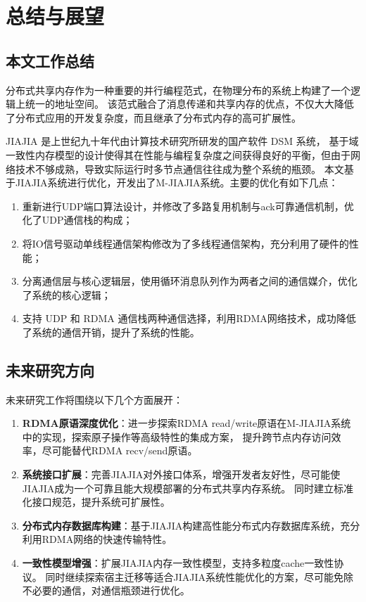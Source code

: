 \chapter{总结与展望}\label{chap:summary}{
    \section{本文工作总结}
    分布式共享内存作为一种重要的并行编程范式，在物理分布的系统上构建了一个逻辑上统一的地址空间。
    该范式融合了消息传递和共享内存的优点，不仅大大降低了分布式应用的开发复杂度，而且继承了分布式内存的高可扩展性。

    JIAJIA 是上世纪九十年代由计算技术研究所研发的国产软件 DSM 系统，
    基于域一致性内存模型的设计使得其在性能与编程复杂度之间获得良好的平衡，但由于网络技术不够成熟，导致实际运行时多节点通信往往成为整个系统的瓶颈。
    本文基于JIAJIA系统进行优化，开发出了M-JIAJIA系统。主要的优化有如下几点：
    \begin{enumerate}
        \item 重新进行UDP端口算法设计，并修改了多路复用机制与ack可靠通信机制，优化了UDP通信栈的构成；
        \item 将IO信号驱动单线程通信架构修改为了多线程通信架构，充分利用了硬件的性能；
        \item 分离通信层与核心逻辑层，使用循环消息队列作为两者之间的通信媒介，优化了系统的核心逻辑；
        \item 支持 UDP 和 RDMA 通信栈两种通信选择，利用RDMA网络技术，成功降低了系统的通信开销，提升了系统的性能。
    \end{enumerate}

    \section{未来研究方向}

    未来研究工作将围绕以下几个方面展开：

    \begin{enumerate}
        \item \textbf{RDMA原语深度优化}：进一步探索RDMA read/write原语在M-JIAJIA系统中的实现，探索原子操作等高级特性的集成方案，
              提升跨节点内存访问效率，尽可能替代RDMA recv/send原语。

        \item \textbf{系统接口扩展}：完善JIAJIA对外接口体系，增强开发者友好性，尽可能使JIAJIA成为一个可靠且能大规模部署的分布式共享内存系统。
              同时建立标准化接口规范，提升系统可扩展性。

        \item \textbf{分布式内存数据库构建}：基于JIAJIA构建高性能分布式内存数据库系统，充分利用RDMA网络的快速传输特性。

        \item \textbf{一致性模型增强}：扩展JIAJIA内存一致性模型，支持多粒度cache一致性协议。
              同时继续探索宿主迁移等适合JIAJIA系统性能优化的方案，尽可能免除不必要的通信，对通信瓶颈进行优化。
    \end{enumerate}
}
